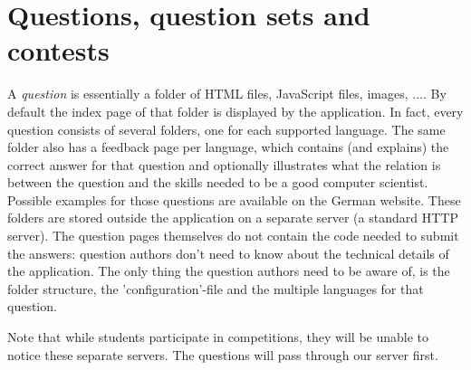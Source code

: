 \section{Questions, question sets and contests}

	A \emph{question} is essentially a folder of HTML files, JavaScript files, images, ....
	By default the index page of that folder is displayed by the application. In fact,
	every question consists of several folders, one for each supported language. The same
	folder also has a feedback page per language, which contains (and explains) the
	correct answer for that question and optionally illustrates what the relation is
	between the question and the skills needed to be a good computer scientist.
	Possible examples for those questions are available on the German website.
	These folders are stored outside the application on a separate server (a standard
	HTTP server). The question pages themselves do not contain the code needed to submit
	the answers: question authors don't need to know about the technical details of the
	application. The only thing the question authors need to be aware of, is the folder
	structure, the 'configuration'-file and the multiple languages for that question.

    Note that while students participate in competitions, they will be unable to
    notice these separate servers. The questions will pass through our server
    first.
	
